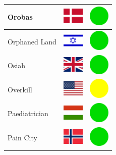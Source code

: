 \documentclass[12pt, a4paper, twoside]{report}
\begin{document}
\begin{center}
\begin{longtable}{|p{5cm}|p{2cm}|p{2cm}|}
 Orobas                                                     & \includegraphics[width=1cm]{../img/flags/dk} &   \includegraphics[width=1cm]{../likes/y} \\ \hline
 Orphaned Land                                              & \includegraphics[width=1cm]{../img/flags/il} &   \includegraphics[width=1cm]{../likes/y} \\ \hline
 Osiah                                                      & \includegraphics[width=1cm]{../img/flags/gb} &   \includegraphics[width=1cm]{../likes/y} \\ \hline
 Overkill                                                   & \includegraphics[width=1cm]{../img/flags/us} &   \includegraphics[width=1cm]{../likes/m} \\ \hline
 Paediatrician                                              & \includegraphics[width=1cm]{../img/flags/hu} &   \includegraphics[width=1cm]{../likes/y} \\ \hline
 Pain City                                                  & \includegraphics[width=1cm]{../img/flags/no} &   \includegraphics[width=1cm]{../likes/y} \\ \hline

\end{longtable}
\end{center}
\end{document}
